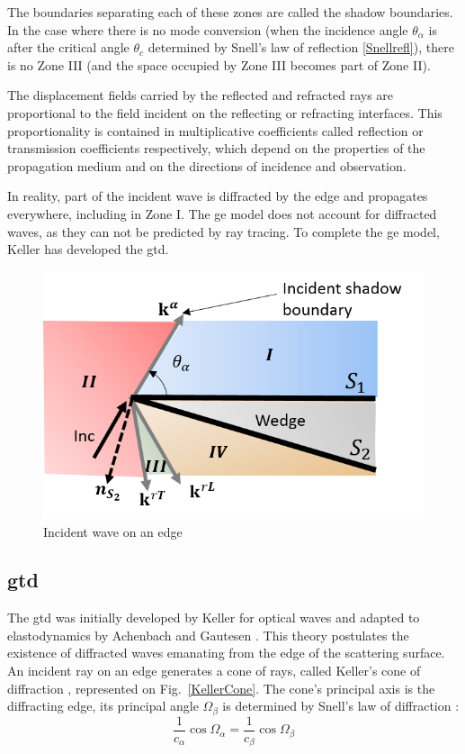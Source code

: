 The boundaries separating each of these zones are called the shadow boundaries. In the case where there is no mode conversion (when the incidence angle $\theta_{\alpha}$ is after the critical angle $\theta_c$ determined by Snell's law of reflection \eqref{Snellrefl}), there is no Zone III (and the space occupied by Zone III becomes part of Zone II). 

The displacement fields carried by the reflected and refracted rays are proportional to the field incident on the reflecting or refracting interfaces. This proportionality is contained in multiplicative coefficients called reflection or transmission coefficients respectively, which depend on the properties of the propagation medium and on the directions of incidence and observation.

In reality, part of the incident wave is diffracted by the edge and propagates everywhere, including in Zone I. The \acrshort{ge} model does not account for diffracted waves, as they can not be predicted by ray tracing. To complete the \acrshort{ge} model, Keller \cite{GTD} has developed the \acrfull{gtd}.

\begin{figure}
    \centering
    \includegraphics[height=0.33\textheight]{images/chapter1/ShadowBoundary.png}
    \caption{Incident wave on an edge}
    \label{illuzones}
\end{figure}

\subsection{\acrfull{gtd}}
\label{C1:GTD}
The \acrfull{gtd} was initially developed by Keller \cite{GTD} for optical waves and adapted to elastodynamics by Achenbach and Gautesen \cite{AchenbachGautesen, Achenbach}. This theory postulates the existence of diffracted waves emanating from the edge of the scattering surface. An incident ray on an edge generates a cone of rays, called Keller's cone of diffraction \cite{GTD}, represented on Fig.~\ref{KellerCone}. The cone's principal axis is the diffracting edge, its principal angle $\Omega_{\beta}$ is determined by Snell's law of diffraction :
\begin{equation}
    \frac{1}{c_{\alpha}}\cos\Omega_{\alpha} = \frac{1}{c_{\beta}} \cos\Omega_{\beta}
    \label{Snelldiff}
\end{equation}

